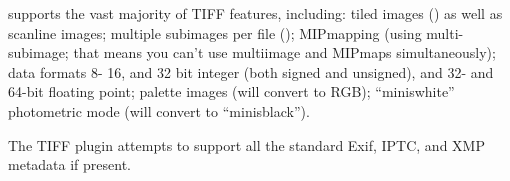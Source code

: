\product supports the vast majority of TIFF features, including: tiled
images () as well as scanline images; multiple subimages per
file (); MIPmapping (using multi-subimage; that means 
you can't use multiimage and MIPmaps simultaneously); data formats
8- 16, and 32 bit integer (both signed and unsigned), and 32- and 64-bit
floating point; palette images (will convert to RGB); ``miniswhite''
photometric mode (will convert to ``minisblack'').

The TIFF plugin attempts to support all the standard Exif, IPTC, and XMP
metadata if present.

\vspace{.125in}

